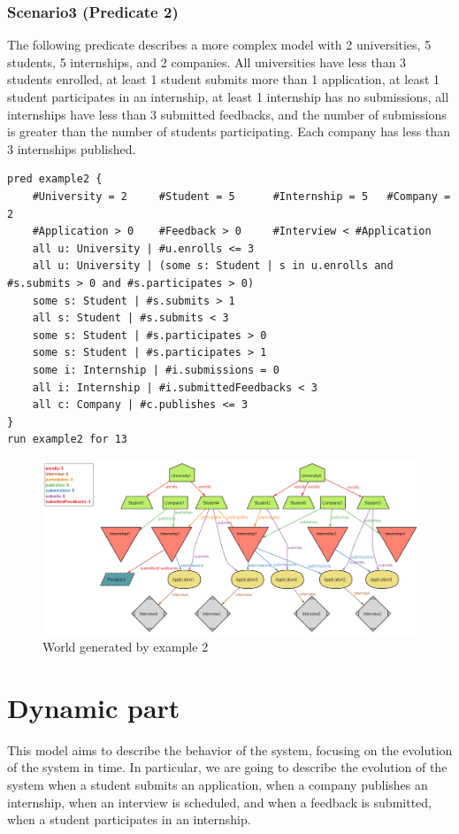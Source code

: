\subsubsection{Scenario3 (Predicate 2)}
The following predicate describes a more complex model with 2 universities, 5 students, 5 internships, and 2 companies.
All universities have less than 3 students enrolled, at least 1 student submits more than 1 application, 
at least 1 student participates in an internship, at least 1 internship has no submissions,
all internships have less than 3 submitted feedbacks, and the number of submissions is greater than the 
number of students participating. Each company has less than 3 internships published.
\begin{lstlisting}
pred example2 {
    #University = 2     #Student = 5      #Internship = 5   #Company = 2
    #Application > 0    #Feedback > 0     #Interview < #Application
    all u: University | #u.enrolls <= 3
    all u: University | (some s: Student | s in u.enrolls and #s.submits > 0 and #s.participates > 0)
    some s: Student | #s.submits > 1
    all s: Student | #s.submits < 3
    some s: Student | #s.participates > 0
    some s: Student | #s.participates > 1
    some i: Internship | #i.submissions = 0
    all i: Internship | #i.submittedFeedbacks < 3
    all c: Company | #c.publishes <= 3
}
run example2 for 13
\end{lstlisting}
\begin{figure}[H]
    \centering
    \includegraphics[width=1\textwidth]{Images/Alloy/example2.png}
    \caption{World generated by example 2}\label{fig:example2}
\end{figure}


\section{Dynamic part}
This model aims to describe the behavior of the system, focusing on the evolution of the system in time. In particular, we are going to
describe the evolution of the system when a student submits an application, when a company publishes an internship, when an interview is scheduled,
and when a feedback is submitted, when a student participates in an internship.

